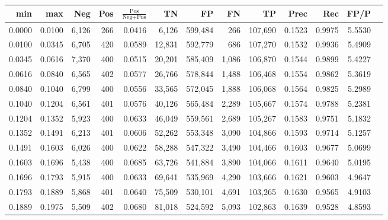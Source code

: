 \begin{tabular}{rrrrrrrrrrrrr}
\toprule
   min &    max &   Neg & Pos & $\frac{\text{Pos}}{\text{Neg}+\text{Pos}}$ &      TN &      FP &      FN &      TP &   Prec &    Rec &   FP/P \\
\midrule
0.0000 & 0.0100 & 6,126 & 266 &                                     0.0416 &   6,126 & 599,484 &     266 & 107,690 & 0.1523 & 0.9975 & 5.5530 \\
0.0100 & 0.0345 & 6,705 & 420 &                                     0.0589 &  12,831 & 592,779 &     686 & 107,270 & 0.1532 & 0.9936 & 5.4909 \\
0.0345 & 0.0616 & 7,370 & 400 &                                     0.0515 &  20,201 & 585,409 &   1,086 & 106,870 & 0.1544 & 0.9899 & 5.4227 \\
0.0616 & 0.0840 & 6,565 & 402 &                                     0.0577 &  26,766 & 578,844 &   1,488 & 106,468 & 0.1554 & 0.9862 & 5.3619 \\
0.0840 & 0.1040 & 6,799 & 400 &                                     0.0556 &  33,565 & 572,045 &   1,888 & 106,068 & 0.1564 & 0.9825 & 5.2989 \\
0.1040 & 0.1204 & 6,561 & 401 &                                     0.0576 &  40,126 & 565,484 &   2,289 & 105,667 & 0.1574 & 0.9788 & 5.2381 \\
0.1204 & 0.1352 & 5,923 & 400 &                                     0.0633 &  46,049 & 559,561 &   2,689 & 105,267 & 0.1583 & 0.9751 & 5.1832 \\
0.1352 & 0.1491 & 6,213 & 401 &                                     0.0606 &  52,262 & 553,348 &   3,090 & 104,866 & 0.1593 & 0.9714 & 5.1257 \\
0.1491 & 0.1603 & 6,026 & 400 &                                     0.0622 &  58,288 & 547,322 &   3,490 & 104,466 & 0.1603 & 0.9677 & 5.0699 \\
0.1603 & 0.1696 & 5,438 & 400 &                                     0.0685 &  63,726 & 541,884 &   3,890 & 104,066 & 0.1611 & 0.9640 & 5.0195 \\
0.1696 & 0.1793 & 5,915 & 400 &                                     0.0633 &  69,641 & 535,969 &   4,290 & 103,666 & 0.1621 & 0.9603 & 4.9647 \\
0.1793 & 0.1889 & 5,868 & 401 &                                     0.0640 &  75,509 & 530,101 &   4,691 & 103,265 & 0.1630 & 0.9565 & 4.9103 \\
0.1889 & 0.1975 & 5,509 & 402 &                                     0.0680 &  81,018 & 524,592 &   5,093 & 102,863 & 0.1639 & 0.9528 & 4.8593 \\

\end{tabular}

